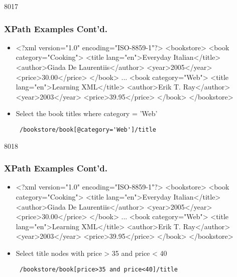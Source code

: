 \begin{slide}[fragile]{8017}
\frametitle{XPath Examples Cont'd.}
\begin{itemize}
\item[]
\begin{xml}
<?xml version="1.0" encoding="ISO-8859-1"?>
<bookstore>
    <book category="Cooking">
        <title lang="en">Everyday Italian</title>
        <author>Giada De Laurentiis</author>
        <year>2005</year>
        <price>30.00</price>
    </book>
    ...
    <book category="Web">
        <title lang="en">Learning XML</title>
        <author>Erik T. Ray</author>
        <year>2003</year>
        <price>39.95</price>
    </book>
</bookstore>
\end{xml}
\vspace{8pt}
\item Select the book titles where category = 'Web'
\begin{verbatim}
 /bookstore/book[@category='Web']/title
\end{verbatim}
\end{itemize}
\end{slide}


\begin{slide}[fragile]{8018}
\frametitle{XPath Examples Cont'd.}
\begin{itemize}
\item[]
\begin{xml}
<?xml version="1.0" encoding="ISO-8859-1"?>
<bookstore>
    <book category="Cooking">
        <title lang="en">Everyday Italian</title>
        <author>Giada De Laurentiis</author>
        <year>2005</year>
        <price>30.00</price>
    </book>
    ...
    <book category="Web">
        <title lang="en">Learning XML</title>
        <author>Erik T. Ray</author>
        <year>2003</year>
        <price>39.95</price>
    </book>
</bookstore>
\end{xml}
\vspace{8pt}
\item Select title nodes with price > 35 and price < 40
\begin{verbatim}
 /bookstore/book[price>35 and price<40]/title
\end{verbatim}
\end{itemize}
\end{slide}
